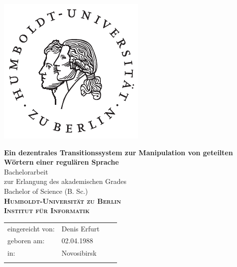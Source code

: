\begin{titlepage}
\hspace{0cm}
\vspace{-2cm}
 
\begin{flushright}
\includegraphics[width=3.2 cm]{bilder/husiegel.pdf}
\end{flushright}
 
 
\begin{center}
  \vspace{0.5 cm}
  \LARGE{\bf Ein dezentrales Transitionssystem zur Manipulation von geteilten Wörtern einer regulären Sprache} \\ %
  \vspace{1 cm}
  \LARGE  Bachelorarbeit \\ %
  \vspace{1cm}
  \Large zur Erlangung des akademischen Grades \\
  Bachelor of Science (B. Sc.) \\ %
  \vspace{1.0cm}
  {\large
    \bf{
      \scshape
      Humboldt-Universit\"at zu Berlin \\
      Institut f\"ur Informatik\\
    }
  } 
\end{center}
\vspace{1.0 cm}
{\large
  \begin{tabular}{llll}
    eingereicht von:    & Denis Erfurt && \\ %
    geboren am:         & 02.04.1988 && \\
    in:                 & Novosibirsk && \\
    &&&\\

\end{tabular}}
\end{titlepage}
